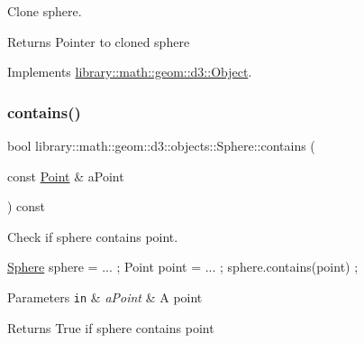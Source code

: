 Clone sphere. 

\begin{DoxyReturn}{Returns}
Pointer to cloned sphere 
\end{DoxyReturn}


Implements \hyperlink{classlibrary_1_1math_1_1geom_1_1d3_1_1_object_a1a784c6b359e0eb97cd34fabc42f2f3f}{library\+::math\+::geom\+::d3\+::\+Object}.

\mbox{\label{classlibrary_1_1math_1_1geom_1_1d3_1_1objects_1_1_sphere_a2780e2754d206379fbe2cdc06b799a2e}} 
\subsubsection{\texorpdfstring{contains()}{contains()}\hspace{0.1cm}{\footnotesize\ttfamily [1/2]}}
{\footnotesize\ttfamily bool library\+::math\+::geom\+::d3\+::objects\+::\+Sphere\+::contains (\begin{DoxyParamCaption}\item[{const \hyperlink{classlibrary_1_1math_1_1geom_1_1d3_1_1objects_1_1_point}{Point} \&}]{a\+Point }\end{DoxyParamCaption}) const}



Check if sphere contains point. 


\begin{DoxyCode}
\hyperlink{classlibrary_1_1math_1_1geom_1_1d3_1_1objects_1_1_sphere_a55dccc8ea16ee55cd7694c26afa8ea39}{Sphere} sphere = ... ;
Point point = ... ;
sphere.contains(point) ;
\end{DoxyCode}



\begin{DoxyParams}[1]{Parameters}
\mbox{\tt in}  & {\em a\+Point} & A point \\
\hline
\end{DoxyParams}
\begin{DoxyReturn}{Returns}
True if sphere contains point 
\end{DoxyReturn}
\mbox{\label{classlibrary_1_1math_1_1geom_1_1d3_1_1objects_1_1_sphere_a75120c9d3ff75cd389ae9ccb98a4218b}} 
